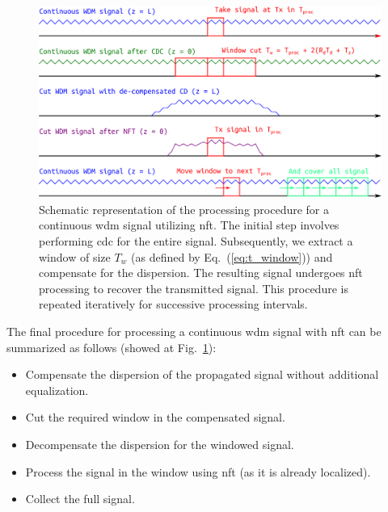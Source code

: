 \begin{figure}[!hbt]
    \centering
    \includegraphics[width=1\linewidth]{images/window/scheme.pdf}
    \caption{Schematic representation of the processing procedure for a continuous \acrshort{wdm} signal utilizing \acrshort{nft}. The initial step involves performing \acrshort{cdc} for the entire signal. Subsequently, we extract a window of size $T_w$ (as defined by Eq.~(\ref{eq:t_window})) and compensate for the dispersion. The resulting signal undergoes \acrshort{nft} processing to recover the transmitted signal. This procedure is repeated iteratively for successive processing intervals.}
    \label{fig:process_scheme_window}
\end{figure}

The final procedure for processing a continuous \acrshort{wdm} signal with \acrshort{nft} can be summarized as follows (showed at Fig.~\ref{fig:process_scheme_window}):
\begin{itemize}
\item Compensate the dispersion of the propagated signal without additional equalization.
\item Cut the required window in the compensated signal.
\item Decompensate the dispersion for the windowed signal.
\item Process the signal in the window using \acrshort{nft} (as it is already localized).
\item Collect the full signal.
\end{itemize}

